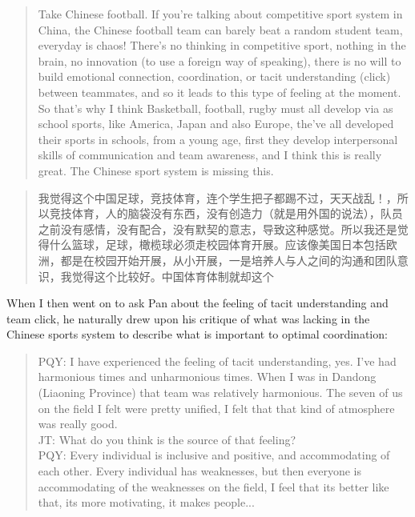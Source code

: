 \begin{CJK}{UTF8}{gbsn}
\begin{quotation}
  Take Chinese football.  If you’re talking about competitive sport system in China, the Chinese football team can barely beat a random student team, everyday is chaos! There’s no thinking in competitive sport, nothing in the brain, no innovation (to use a foreign way of speaking), there is no will to build emotional connection, coordination, or tacit understanding (click) between teammates, and so it leads to this type of feeling at the moment.  So that's why I think Basketball, football, rugby must all develop via as school sports, like America, Japan and also Europe, the’ve all developed their sports in schools, from a young age, first they develop interpersonal skills of communication and team awareness, and I think this is really great.  The Chinese sport system is missing this.
\end{quotation}

\begin{quotation}
  我觉得这个中国足球，竞技体育，连个学生把子都踢不过，天天战乱！，所以竞技体育，人的脑袋没有东西，没有创造力（就是用外国的说法），队员之前没有感情，没有配合，没有默契的意志，导致这种感觉。所以我还是觉得什么篮球，足球，橄榄球必须走校园体育开展。应该像美国日本包括欧洲，都是在校园开始开展，从小开展，一是培养人与人之间的沟通和团队意识，我觉得这个比较好。中国体育体制就却这个
\end{quotation}

When I then went on to ask Pan about the feeling of tacit understanding and team click, he naturally drew upon his critique of what was lacking in the Chinese sports system to describe what is important to optimal coordination:

\begin{quotation}
  PQY: I have experienced the feeling of tacit understanding, yes. I've had harmonious times and unharmonious times. When I was in Dandong (Liaoning Province) that team was relatively harmonious.  The seven of us on the field I felt were pretty unified, I felt that that kind of atmosphere was really good. \\
  JT: What do you think is the source of that feeling? \\
  PQY: Every individual is inclusive and positive, and accommodating of each other. Every individual has weaknesses, but then everyone is accommodating of the weaknesses on the field, I feel that its better like that, its more motivating, it makes people...
\end{quotation}


\end{CJK}
